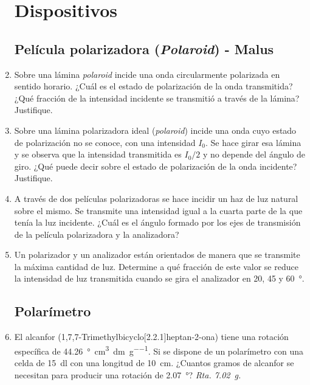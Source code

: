 \documentclass[11pt,spanish,a4paper,twoside]{article}
\begin{document}
\begin{enumerate}
\section*{Dispositivos}


\subsection*{Película polarizadora (\emph{Polaroid}) - Malus}

\item
Sobre una lámina \emph{polaroid} incide una onda circularmente polarizada en sentido horario.
¿Cuál es el estado de polarización de la onda transmitida?
¿Qué fracción de la intensidad incidente se transmitió a través de la lámina?
Justifique.


\item
Sobre una lámina polarizadora ideal (\emph{polaroid}) incide una onda cuyo estado de polarización no se conoce, con una intensidad \(I_0\).
Se hace girar esa lámina y se observa que la intensidad transmitida es \(I_0/2\) y no depende del ángulo de giro.
¿Qué puede decir sobre el estado de polarización de la onda incidente?
Justifique.

\item
A través de dos películas polarizadoras se hace incidir un haz de luz natural sobre el mismo.
Se transmite una intensidad igual a la cuarta parte de la que tenía la luz incidente.
¿Cuál es el ángulo formado por los ejes de transmisión de la película polarizadora y la analizadora?


\item
Un polarizador y un analizador están orientados de manera que se transmite la máxima cantidad de luz.
Determine a qué fracción de este valor se reduce la intensidad de luz transmitida cuando se gira el analizador en 20, 45 y \SI{60}{\degree}.



\subsection*{Polarímetro}

\item
El alcanfor (1,7,7-Trimethylbicyclo[2.2.1]heptan-2-ona) tiene una rotación específica de \SI{+44,26}{\degree\cubic\centi\metre\per\deci\metre\per\gram}.
Si se dispone de un polarímetro con una celda de \SI{15}{\deci\litre} con una longitud de \SI{10}{cm}.
¿Cuantos gramos de alcanfor se necesitan para producir una rotación de \SI{2,07}{\degree}?
\textit{Rta. \SI{7,02}{\gram}.}


\end{enumerate}
\end{document}
